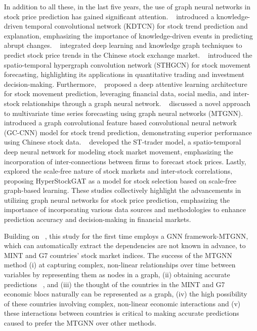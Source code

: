 In addition to all these, in the last five years, the use of graph neural networks in stock price prediction has gained significant attention. ~\cite{deng2019knowledge} introduced a knowledge-driven temporal convolutional network (KDTCN) for stock trend prediction and explanation, emphasizing the importance of knowledge-driven events in predicting abrupt changes. ~\cite{long2020integrated} integrated deep learning and knowledge graph techniques to predict stock price trends in the Chinese stock exchange market. ~\cite{sawhney2020spatiotemporal} introduced the spatio-temporal hypergraph convolution network (STHGCN) for stock movement forecasting, highlighting its applications in quantitative trading and investment decision-making. Furthermore, ~\cite{sawhney2020deep} proposed a deep attentive learning architecture for stock movement prediction, leveraging financial data, social media, and inter-stock relationships through a graph neural network. ~\cite{wu2020connecting} discussed a novel approach to multivariate time series forecasting using graph neural networks (MTGNN). ~\cite{chen2021novel} introduced a graph convolutional feature based convolutional neural network (GC-CNN) model for stock trend prediction, demonstrating superior performance using Chinese stock data. ~\cite{hou2021st} developed the ST-trader model, a spatio-temporal deep neural network for modeling stock market movement, emphasizing the incorporation of inter-connections between firms to forecast stock prices. Lastly, ~\cite{sawhney2021exploring} explored the scale-free nature of stock markets and inter-stock correlations, proposing HyperStockGAT as a model for stock selection based on scale-free graph-based learning. These studies collectively highlight the advancements in utilizing graph neural networks for stock price prediction, emphasizing the importance of incorporating various data sources and methodologies to enhance prediction accuracy and decision-making in financial markets.

Building on ~\cite{wu2020connecting}, this study for the first time employs a GNN framework-MTGNN, which can automatically extract the dependencies are not known in advance, to MINT and G7 countries' stock market indices. The success of the MTGNN method (i) at capturing complex, non-linear relationships over time between variables by representing them as nodes in a graph, (ii) obtaining accurate predictions ~\cite{wu2020connecting, cui2021metro, he2022multivariate, liu2022multivariate, jin2022multivariate, chen2022multi, chen2023multi}, and (iii) the thought of the countries in the MINT and G7 economic blocs naturally can be represented as a graph, (iv) the high possibility of these countries involving complex, non-linear economic interactions and (v) these interactions between countries is critical to making accurate predictions caused to prefer the MTGNN over other methods.

